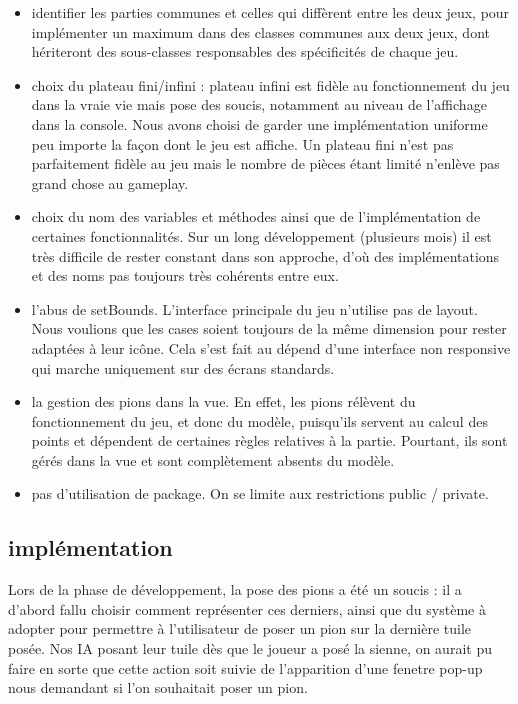 \documentclass{article}
\begin{document}
\begin{itemize}
  \item  identifier les parties communes et celles qui diffèrent entre les deux jeux, pour implémenter un maximum dans des classes communes aux deux jeux, dont hériteront des sous-classes responsables des spécificités de chaque jeu.
  \item choix du plateau fini/infini : plateau infini est fidèle au fonctionnement du jeu dans la vraie vie mais pose des soucis, notamment au niveau de l'affichage dans la console. Nous avons choisi de garder une implémentation uniforme peu importe la façon dont le jeu est affiche. Un plateau fini n'est pas parfaitement fidèle au jeu mais le nombre de pièces étant limité n'enlève pas grand chose au gameplay.
  \item choix du nom des variables et méthodes ainsi que de l'implémentation de certaines fonctionnalités. Sur un long développement (plusieurs mois) il est très difficile de rester constant dans son approche, d'où des implémentations et des noms pas toujours très cohérents entre eux.
  \item l'abus de setBounds. L'interface principale du jeu n'utilise pas de layout. Nous voulions que les cases soient toujours de la même dimension pour rester adaptées à leur icône. Cela s'est fait au dépend d'une interface non responsive qui marche uniquement sur des écrans standards.
  \item la gestion des pions dans la vue. En effet, les pions rélèvent du fonctionnement du jeu, et donc du modèle, puisqu'ils servent au calcul des points et dépendent de certaines règles relatives à la partie. Pourtant, ils sont gérés dans la vue et sont complètement absents du modèle.
  \item pas d'utilisation de package. On se limite aux restrictions public / private.
\end{itemize}

\subsection{implémentation}

Lors de la phase de développement, la pose des pions a été un soucis : il a d'abord fallu choisir comment représenter ces derniers, ainsi que du système à adopter pour permettre à l'utilisateur de poser un pion sur la dernière tuile posée. Nos IA posant leur tuile dès que le joueur a posé la sienne, on aurait pu faire en sorte que cette action soit suivie de l'apparition d'une fenetre pop-up nous demandant si l'on souhaitait poser un pion. 
\end{document}
